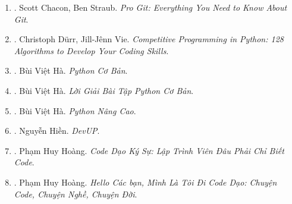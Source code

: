 \documentclass{article}
\begin{document}
\begin{enumerate}
\begin{itemize}
		\item ``A data structure is a way to store \& organize data in order to facilitate access \& modifications.''
		\item ``Machine learning can be thought of as a method for performing algorithmic tasks without explicitly designing an algorithm, but instead inferring patterns from data \& thereby automatically learning a solution.''
		\item ``The running time of an algorithm on a particular input is the number of instructions \& data accesses executed.''
	\end{itemize}
	{\sf About Author.} {\sc Thomas H. Cormen} is Emeritus Professor of Computer Science at Dartmouth College. {\sc Charles E. Leiserson} is Edwin Sibley Webster Professor in Electrical Engineering \& Computer Science at MIT. {\sc Ronald L. Rivest} is Institute Professor at MIT. {\sc Clifford Stein} is Wai T. Chang Professor of Industrial Engineering \& Operations Research, \& of Computer Science at Columbia University.
	
	\item \cite{Chacon_Straub2014}. Scott Chacon, Ben Straub. {\it Pro Git: Everything You Need to Know About Git}.\hfill{\sf[reading]}
	
	\item \cite{Durr_Vie2021}. Christoph D\"urr, Jill-J\^enn Vie. {\it Competitive Programming in Python: 128 Algorithms to Develop Your Coding Skills}.
	
	\item \cite{Ha_Python_co_ban}. Bùi Việt Hà. {\it Python Cơ Bản}.\hfill{\sf[done]}
	
	\item \cite{Ha_loi_giai_BT_Python_co_ban}. Bùi Việt Hà. {\it Lời Giải Bài Tập Python Cơ Bản}.\hfill{\sf[reading]}
	
	\item \cite{Ha_Python_nang_cao}. Bùi Việt Hà. {\it Python Nâng Cao}.\hfill{\sf[done]}
	
	\item \cite{Hien_DevUp}. Nguyễn Hiền. {\it DevUP}.\hfill{\sf[done]}
	
	\item \cite{Hoang_code_dao_ky_su}. Phạm Huy Hoàng. {\it Code Dạo Ký Sự: Lập Trình Viên Đâu Phải Chỉ Biết Code}.\hfill{\sf[done]}
	
	\item \cite{Hoang_toi_di_code_dao}. Phạm Huy Hoàng. {\it Hello Các bạn, Mình Là Tôi Đi Code Dạo: Chuyện Code, Chuyện Nghề, Chuyện Đời}.\hfill{\sf[done]}
	

\end{enumerate}
\end{document}
